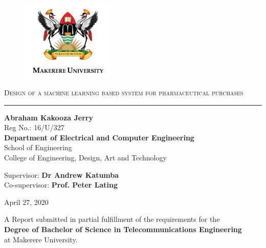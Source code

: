 \documentclass[12pt]{report}
\begin{document}
\begin{titlepage}
\centering

\begin{figure}[H]
\centering
\includegraphics[width=0.4\textwidth]{MAK_Logo2_png.png}%
\end{figure}


\textsc{}


{\huge \textsc{Design of a machine learning based system for pharmaceutical purchases}  \\}
\rule{3in}{0.4pt}


{\Large\textbf{Abraham Kakooza Jerry}	 \\}
Reg No.: 16/U/327\\ \vspace{2cm}
{\large \textbf{Department of Electrical and Computer Engineering} \\
School of Engineering \\
College of Engineering, Design, Art and Technology}




{
Supervisor: \textbf{Dr Andrew Katumba}    \\
Co-supervisor: \textbf{Prof. Peter Lating} }


April 27, 2020


{
A Report submitted in partial fulfillment of the requirements for the \\ \textbf{ Degree of Bachelor of Science in Telecommunications Engineering} \\ at Makerere University. }


\end{titlepage}
\end{document}
